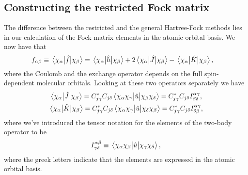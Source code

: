         \subsection{Constructing the restricted Fock matrix}
            The difference between the restricted and the general Hartree-Fock
            methods lies in our calculation of the Fock matrix elements in the
            atomic orbital basis.
            We now have that
            \begin{align}
                f_{\alpha\beta}
                &\equiv \mel{\chi_{\alpha}}{\hat{f}}{\chi_{\beta}}
                =
                \mel{\chi_{\alpha}}{\hat{h}}{\chi_{\beta}}
                +
                2
                \mel{\chi_{\alpha}}{\hat{J}}{\chi_{\beta}}
                -
                \mel{\chi_{\alpha}}{\hat{K}}{\chi_{\beta}},
            \end{align}
            where the Coulomb and the exchange operator depends on the full
            spin-dependent molecular orbitals.
            Looking at these two operators separately we have
            \begin{gather}
                \mel{\chi_{\alpha}}{\hat{J}}{\chi_{\beta}}
                =
                C^{*}_{j\gamma} C_{j\delta}
                \mel{\chi_{\alpha}\chi_{\gamma}}{
                    \hat{u}}{\chi_{\beta}\chi_{\delta}}
                =
                C^{*}_{j\gamma} C_{j\delta}
                I^{\alpha\gamma}_{\beta\delta},
                \\
                \mel{\chi_{\alpha}}{\hat{K}}{\chi_{\beta}}
                =
                C^{*}_{j\gamma} C_{j\delta}
                \mel{\chi_{\alpha}\chi_{\gamma}}{
                    \hat{u}}{\chi_{\delta}\chi_{\beta}}
                =
                C^{*}_{j\gamma} C_{j\delta}
                I^{\alpha\gamma}_{\delta\beta},
            \end{gather}
            where we've introduced the tensor notation for the elements of the
            two-body operator to be
            \begin{align}
                I^{\alpha\beta}_{\gamma\delta}
                \equiv
                \mel{\chi_{\alpha}\chi_{\beta}}{
                    \hat{u}}{\chi_{\gamma}\chi_{\delta}},
            \end{align}
            where the greek letters indicate that the elements are expressed in
            the atomic orbital basis.
